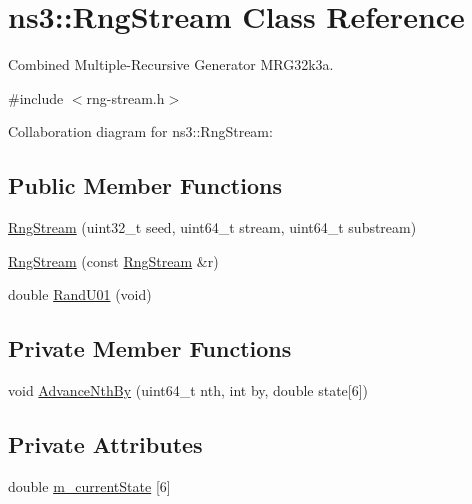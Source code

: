 \hypertarget{classns3_1_1RngStream}{}\section{ns3\+:\+:Rng\+Stream Class Reference}
\label{classns3_1_1RngStream}


Combined Multiple-\/\+Recursive Generator M\+R\+G32k3a.  




{\ttfamily \#include $<$rng-\/stream.\+h$>$}



Collaboration diagram for ns3\+:\+:Rng\+Stream\+:
\subsection*{Public Member Functions}
\begin{DoxyCompactItemize}
\item 
\hyperlink{classns3_1_1RngStream_a243980aebbb585fac06b360813b0c808}{Rng\+Stream} (uint32\+\_\+t seed, uint64\+\_\+t stream, uint64\+\_\+t substream)
\item 
\hyperlink{classns3_1_1RngStream_a12711b2dea119cdfeb5398a6b6b16bf2}{Rng\+Stream} (const \hyperlink{classns3_1_1RngStream}{Rng\+Stream} \&r)
\item 
double \hyperlink{classns3_1_1RngStream_a46be36426b8bc712e9de468b63558c22}{Rand\+U01} (void)
\end{DoxyCompactItemize}
\subsection*{Private Member Functions}
\begin{DoxyCompactItemize}
\item 
void \hyperlink{classns3_1_1RngStream_a6ec2451aa49df691a30bc4ca527b2355}{Advance\+Nth\+By} (uint64\+\_\+t nth, int by, double state\mbox{[}6\mbox{]})
\end{DoxyCompactItemize}
\subsection*{Private Attributes}
\begin{DoxyCompactItemize}
\item 
double \hyperlink{classns3_1_1RngStream_a598f63b0d43cf513170b25b70d9e23f1}{m\+\_\+current\+State} \mbox{[}6\mbox{]}
\end{DoxyCompactItemize}


